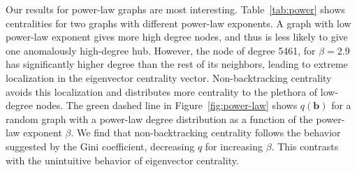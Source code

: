 \documentclass[twocolumn,prl,superscriptaddress]{revtex4}
\renewcommand{\vec}{\mathbf}
\newcommand\colorb{green }
\begin{document}
Our results for power-law graphs are most interesting.
Table~\ref{tab:power} shows centralities for two graphs with different power-law exponents.
A graph with low power-law exponent gives more high degree nodes, and thus is less likely to give one anomalously high-degree hub.
However, the node of degree 5461, for $\beta = 2.9$ has significantly higher degree than the rest of its neighbors, leading to extreme localization in the eigenvector centrality vector.
Non-backtracking centrality avoids this localization and distributes more centrality to the plethora of low-degree nodes.
The \colorb dashed line in Figure~\ref{fig:power-law} shows $q(\vec{b})$ for a random graph with a power-law degree distribution as a function of the power-law exponent $\beta$. We find that non-backtracking centrality follows the behavior suggested by the Gini coefficient, decreasing $q$ for increasing $\beta$. This contrasts with the unintuitive behavior of eigenvector centrality.
\end{document}

